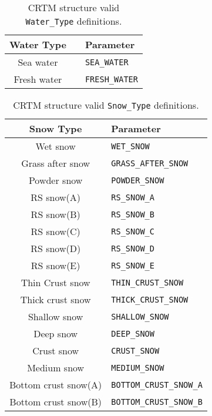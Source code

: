 \begin{table}[htp]
  \centering
  \begin{tabular}{cc l}
    \hline
    \sffamily\textbf{Water Type} & \hspace{0.5cm} & \sffamily\textbf{Parameter} \\
    \hline\hline
      Sea water  & \hspace{0.5cm} &  \texttt{SEA\_WATER} \\     
     Fresh water & \hspace{0.5cm} &  \texttt{FRESH\_WATER} \\   
    \hline
  \end{tabular}
  \caption{CRTM \Surface{} structure valid \texttt{Water\_Type} definitions.}
  \label{tab:surface_water_type}
\end{table}

\begin{table}[htp]
  \centering
  \begin{tabular}{c l}
    \hline
    \sffamily\textbf{Snow Type} & \sffamily\textbf{Parameter} \\
    \hline\hline
         Wet snow          &   \texttt{WET\_SNOW} \\           
      Grass after snow     &   \texttt{GRASS\_AFTER\_SNOW} \\   
        Powder snow        &   \texttt{POWDER\_SNOW} \\        
         RS snow(A)        &   \texttt{RS\_SNOW\_A} \\          
         RS snow(B)        &   \texttt{RS\_SNOW\_B} \\          
         RS snow(C)        &   \texttt{RS\_SNOW\_C} \\          
         RS snow(D)        &   \texttt{RS\_SNOW\_D} \\          
         RS snow(E)        &   \texttt{RS\_SNOW\_E} \\          
      Thin Crust snow      &   \texttt{THIN\_CRUST\_SNOW} \\    
      Thick crust snow     &   \texttt{THICK\_CRUST\_SNOW } \\  
        Shallow snow       &   \texttt{SHALLOW\_SNOW} \\       
         Deep snow         &   \texttt{DEEP\_SNOW} \\          
        Crust snow         &   \texttt{CRUST\_SNOW} \\         
        Medium snow        &   \texttt{MEDIUM\_SNOW} \\        
     Bottom crust snow(A)  &   \texttt{BOTTOM\_CRUST\_SNOW\_A} \\
     Bottom crust snow(B)  &   \texttt{BOTTOM\_CRUST\_SNOW\_B} \\
    \hline
  \end{tabular}
  \caption{CRTM \Surface{} structure valid \texttt{Snow\_Type} definitions.}
  \label{tab:surface_snow_type}
\end{table}

